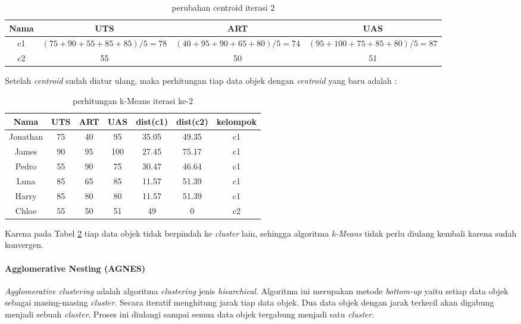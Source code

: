 \documentclass[a4paper,twoside]{article}
\begin{document}
\begin{enumerate}
\begin{table}[ht]
\centering
\begin{tabular}{|c|c|c|c|}
\hline 
Nama & UTS & ART & UAS \\ 
\hline 
c1 & $(75+90+55+85+85)/5 =  78$ & $(40+95+90+65+80)/5 = 74$ & $(95+100+75+85+80)/5 = 87$ \\ 
\hline 
c2 & 55 & 50 & 51 \\ 
\hline 
\end{tabular} 
\caption{perubahan centroid iterasi 2}
\label{tab:centroid1}
\end{table}

Setelah \textit{centroid} sudah diatur ulang, maka perhitungan tiap data objek dengan \textit{centroid} yang baru adalah : 

\begin{table}[ht]
\centering
\begin{tabular}{|c|c|c|c|c|c|c|}
\hline 
Nama & UTS & ART & UAS & dist(c1) & dist(c2) & kelompok \\ 
\hline 
Jonathan & 75 & 40 & 95 & 35.05 & 49.35 & c1 \\ 
\hline 
James & 90 & 95 & 100 & 27.45 & 75.17 & c1 \\ 
\hline 
Pedro & 55 & 90 & 75 & 30.47 & 46.64 & c1 \\ 
\hline 
Luna & 85 & 65 & 85 & 11.57 & 51.39 & c1 \\ 
\hline 
Harry & 85 & 80 & 80 & 11.57 & 51.39 & c1 \\ 
\hline 
Chloe & 55 & 50 & 51 & 49 & 0 & c2 \\ 
\hline 
\end{tabular} 
\caption{perhitungan k-Means iterasi ke-2}
\label{tab:kmeansiterasi2}
\end{table}
Karena pada Tabel \ref{tab:kmeansiterasi2} tiap data objek tidak berpindah ke \textit{cluster} lain, sehingga algoritma \textit{k-Means} tidak perlu diulang kembali karena sudah konvergen.
\paragraph{Agglomerative Nesting (AGNES)}
\textit{Agglomerative clustering} adalah algoritma \textit{clustering} jenis \textit{hiearchical}. Algoritma ini merupakan metode \textit{bottom-up} yaitu setiap data objek sebagai masing-masing \textit{cluster}. Secara iteratif menghitung jarak tiap data objek. Dua data objek dengan jarak terkecil akan digabung menjadi sebuah \textit{cluster}. Proses ini diulangi sampai semua data objek tergabung menjadi satu \textit{cluster}. 


\end{enumerate}
\end{document}
